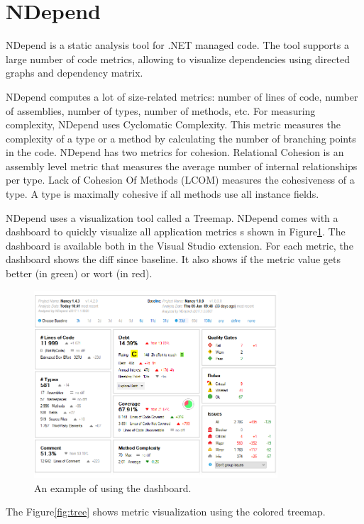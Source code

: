 \section{NDepend}

NDepend is a static analysis tool for .NET managed code. The tool supports a large number of code metrics, allowing to visualize dependencies using directed graphs and dependency matrix.  

NDepend computes a lot of size-related metrics: number of lines of code, number of assemblies, number of types, number of methods, etc. For measuring complexity, NDepend uses Cyclomatic Complexity. This metric measures the complexity of a type or a method by calculating the number of branching points in the code.
NDepend has two metrics for cohesion. Relational Cohesion is an assembly level metric that measures the average number of internal relationships per type. Lack of Cohesion Of Methods (LCOM) measures the cohesiveness of a type. A type is maximally cohesive if all methods use all instance fields.

NDepend uses a visualization tool called a Treemap.
NDepend comes with a dashboard to quickly visualize all application metrics s shown in Figure\ref{fig:dash}. The dashboard is available both in the Visual Studio extension. For each metric, the dashboard shows the diff since baseline. It also shows if the metric value gets better (in green) or wort (in red). 

\begin{figure}[h]
	\centering
	\includegraphics[height=70mm]{figures/dash.png}
	\caption{An example of using the dashboard.}
	\label{fig:dash}
\end{figure}

The Figure\ref{fig:tree} shows metric visualization using the colored treemap.

